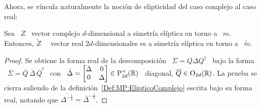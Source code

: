 Ahora, se v\'incula naturalmente la noci\'on de elipticidad del caso complejo al
caso real:
%
\begin{lema}
  Sea \ $Z$ \ vector complejo $d$-dimensional a simetr\'ia el\'iptica en torno a
  \  $m$.  Entonces,  $\widetilde{Z}$ \  \ vector  real $2d$-dimensionales  es a
  simetr\'ia el\'iptica en torno a \ $\widetilde{m}$.
\end{lema}
%
\begin{proof}
  Se obtiene la forma real de la descomposici\'on \ $\Sigma = Q \Delta Q^\dag$ \
  bajo  la forma  \ $\overline{\Sigma}  = \overline{Q}  \,  \bar{\Delta} \,
  \overline{Q}^t$ \ con \ $\bar{\Delta}  = \begin{bmatrix} \Delta & 0\\ 0 &
    \Delta \end{bmatrix}  \in \mathrm{P}_{2d}^+(\mathbb{R})$ \  diagonal, $\overline{Q} \in
  \mathrm{O}_{2d}(\mathbb{R})$.      La    prueba    se     cierra    saliendo     de    la
  definici\'on~\ref{Def:MP:ElipticoComplejo} escrita bajo su forma real, notando
  que $\overline{\Delta^{-\frac12}} = \bar{\Delta}^{-\frac12}$.
\end{proof}

